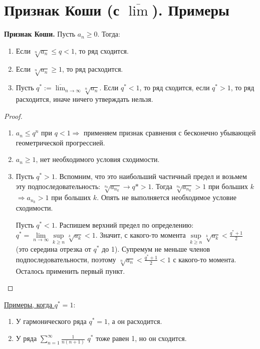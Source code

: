 \section{Признак Коши (с $\overline{\lim}$). Примеры}
\textbf{Признак Коши.} 
Пусть $a_n \geqslant 0$. Тогда:
\begin{enumerate}
    \item Если $\sqrt[n]{a_n} \leqslant q < 1$, то ряд сходится.
    \item Если $\sqrt[n]{a_n} \geqslant 1$, то ряд расходится.
    \item Пусть $q^* := \overline{\lim}_{n \to \infty} \sqrt[n]{a_n}$.
    Если $q^* < 1$, то ряд сходится, если $q^* > 1$, то ряд расходится, иначе ничего утверждать нельзя.
\end{enumerate}
\begin{proof} \quad

    \begin{enumerate}
        \item $a_n \leqslant q^n$ при $q < 1 \Rightarrow$ применяем признак сравнения с бесконечно убывающей геометрической прогрессией.
        \item $a_n \geqslant 1$, нет необходимого условия сходимости.
        \item Пусть $q^* > 1$. 
        Вспомним, что это наибольший частичный предел и возьмем эту подпоследовательность: $\sqrt[n_k]{a_{n_k}} \to q* > 1$.
        Тогда $\sqrt[n_k]{a_{n_k}} > 1$ при больших $k$ $\Rightarrow a_{n_k} > 1$ при больших $k$.
        Опять не выполняется необходимое условие сходимости.

        Пусть $q^* < 1$. 
        Распишем верхний предел по определению: $q^* = \lim\limits_{n \to \infty} \sup\limits_{k \geqslant n} \sqrt[k]{a_k} < 1$. 
        Значит, с какого-то момента $\sup\limits_{k \geqslant n} \sqrt[k]{a_k} < \frac{q^* + 1}{2}$ (это середина отрезка от $q^*$ до 1).
        Супремум не меньше членов подпоследовательности, поэтому $\sqrt[n]{a_n} < \frac{q^* + 1}{2} < 1$ с какого-то момента.
        Осталось применить первый пункт.
    \end{enumerate}
\end{proof}

\underline{Примеры, когда $q^* = 1:$}
\begin{enumerate}
    \item У гармонического ряда $q^* = 1$, а он расходится.
    \item У ряда $\sum\limits_{n=1}^{\infty} \frac{1}{n(n+1)}$ $q^*$ тоже равен 1, но он сходится. 
\end{enumerate}
